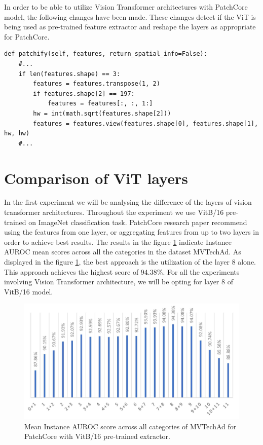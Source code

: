 In order to be able to utilize Vision Transformer architectures with PatchCore model, the following changes have been made. These changes detect if the ViT is being used as pre-trained feature extractor and reshape the layers as appropriate for PatchCore.

\begin{lstlisting}
def patchify(self, features, return_spatial_info=False):
	#...
	if len(features.shape) == 3:
		features = features.transpose(1, 2)
		if features.shape[2] == 197:
			features = features[:, :, 1:]
		hw = int(math.sqrt(features.shape[2]))
		features = features.view(features.shape[0], features.shape[1], hw, hw)
	#...
\end{lstlisting}

\section{Comparison of ViT layers}
\label{vit layers}

In the first experiment we will be analysing the difference of the layers of vision transformer architectures. Throughout the experiment we use VitB/16 pre-trained on ImageNet classification task. PatchCore research paper recommend using the features from one layer, or aggregating features from up to two layers in order to achieve best results. The results in the figure \ref{fig:vit_layers} indicate Instance AUROC mean scores across all the categories in the dataset MVTechAd. As displayed in the figure \ref{fig:vit_layers}, the best approach is the utilization of the layer 8 alone. This approach achieves the highest score of 94.38\%. For all the experiments involving Vision Transformer architecture, we will be opting for layer 8 of VitB/16 model.

\begin{figure}[h]
	\begin{center}
		\includegraphics[width=1.0\linewidth]{Chapter_4/vit.png}
	\end{center}
	\caption{Mean Instance AUROC score across all categories of MVTechAd for PatchCore with VitB/16 pre-trained extractor.}
	\label{fig:vit_layers}
\end{figure}

